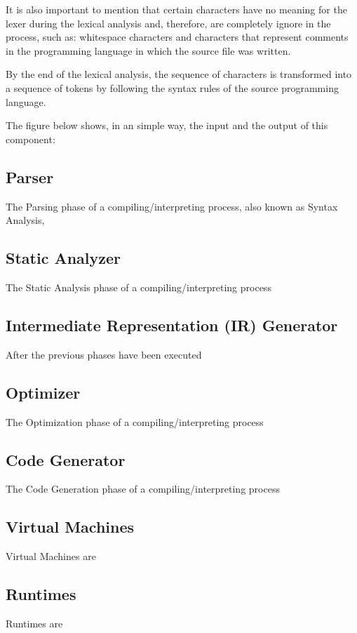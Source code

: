 It is also important to mention that certain characters have no meaning for the lexer during the lexical analysis and, therefore, are completely ignore in the process, such as: whitespace characters and characters that represent comments in the programming language in which the source file was written.

By the end of the lexical analysis, the sequence of characters is transformed into a sequence of tokens by following the syntax rules of the source programming language.

The figure below shows, in an simple way, the input and the output of this component:

\subsection{Parser}
The Parsing phase of a compiling/interpreting process, also known as Syntax Analysis,

\subsection{Static Analyzer}
The Static Analysis phase of a compiling/interpreting process

\subsection{Intermediate Representation (IR) Generator}
After the previous phases have been executed

\subsection{Optimizer}
The Optimization phase of a compiling/interpreting process

\subsection{Code Generator}
The Code Generation phase of a compiling/interpreting process


\subsection{Virtual Machines}
Virtual Machines are 

\subsection{Runtimes}
Runtimes are

